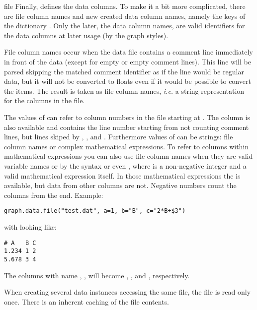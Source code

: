 \begin{classdesc}{file}
  Finally,  defines the data columns. To make it a bit
  more complicated, there are file column names and new created data
  column names, namely the keys of the dictionary .
  Only the later, the data column names, are valid identifiers for the
  data columns at later usage (by the graph styles).

  File column names occur when the data file contains a comment line
  immediately in front of the data (except for empty or empty comment
  lines). This line will be parsed skipping the matched comment
  identifier as if the line would be regular data, but it will not be
  converted to floats even if it would be possible to convert the
  items. The result is taken as file column names, \emph{i.e.} a
  string representation for the columns in the file.

  The values of  can refer to column numbers in the
  file starting at . The column  is also available
  and contains the line number starting from  not counting
  comment lines, but lines skiped by , ,
  and . Furthermore values of  can be
  strings: file column names or complex mathematical expressions. To
  refer to columns within mathematical expressions you can also use
  file column names when they are valid variable names or by the
  syntax  or even
  , where  is a non-negative integer and  a valid mathematical expression itself. In
  those mathematical expressions the  is available, but
  data from other columns are not. Negative numbers count the columns
  from the end. Example:
  \begin{verbatim}
graph.data.file("test.dat", a=1, b="B", c="2*B+$3")
  \end{verbatim}
  with  looking like:
  \begin{verbatim}
# A   B C
1.234 1 2
5.678 3 4
  \end{verbatim}
  The columns with name , ,  will become
  \samp{[1.234, 5.678]}, \samp{[1.0, 3.0]}, and \samp{[4.0, 10.0]},
  respectively.

  When creating several data instances accessing the same file,
  the file is read only once. There is an inherent caching of the
  file contents.
\end{classdesc}

